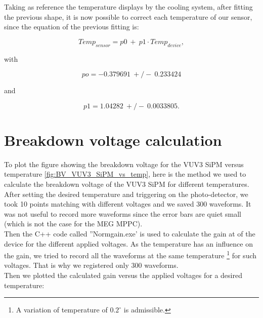 \documentclass[a4paper, 11pt]{report}%
\begin{document}
  Taking as reference the temperature displays by the cooling system, after fitting the previous shape, it is now possible to correct 
  each temperature of our sensor, since the equation of the previous fitting is:
  
  \begin{equation}
     Temp_{sensor} = p0\ +\ p1\cdot Temp_{device},
  \end{equation}

  with 
  
  \begin{equation}
     po = -0.379691\   +/-\   0.233424
  \end{equation}
  
  and 
  
  \begin{equation}
    p1 = 1.04282\ +/-\ 0.0033805.
  \end{equation}

 \newpage
 
 \section{Breakdown voltage calculation}
  
  To plot the figure showing the breakdown voltage for the VUV3 SiPM versus temperature \ref{fig:BV_VUV3_SiPM_vs_temp}, here is the method 
  we used to calculate the breakdown voltage of the VUV3 SiPM for different temperatures.
  \\
  
  After setting the desired temperature and triggering on the photo-detector, we took 10 points matching with different voltages and
  we saved 300 waveforms. It was not useful to record more waveforms since the error bars are quiet small (which is not the case for the 
  MEG MPPC). 
  \\
  
  Then the C++ code called ''Normgain.exe' is used to calculate the gain at of the device for the different applied voltages. As the 
  temperature has an influence on the gain, we tried to record all the waveforms at the same temperature \footnote{A variation of temperature
  of $0.2^\circ$ is admissible.} for  such voltages. That is why we registered only 300 waveforms. 
  \\
  
  Then we plotted the calculated gain versus the applied voltages for a desired temperature: 
  
\end{document}
